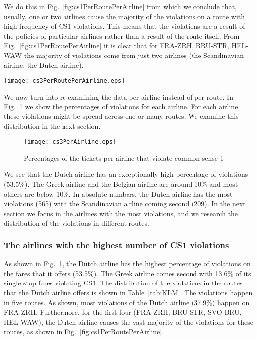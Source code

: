 We do this in Fig.~\ref{fig:cs1PerRoutePerAirline} from which we conclude that, usually, 
one or two airlines cause the majority of the violations on a route with high 
frequency of CS1 violations.  This means that the violations are a result of the
policies of particular airlines rather than a result of the route itself.  
From Fig.~\ref{fig:cs1PerRoutePerAirline} it is clear that for FRA-ZRH, BRU-STR,
HEL-WAW the majority of violations come from just two airlines (the Scandinavian airline, the Dutch airline).

\begin{figure*}[t]
\centering
\texttt{[image: cs3PerRoutePerAirline.eps]}
\caption{Percentages of the violations per airline and route}
\label{fig:cs1PerRoutePerAirline}
\end{figure*}

We now turn into re-examining the data per airline instead of per route. 
In Fig.~\ref{fig:cs1PerAirline} we show the percentages of violations
for each airline. For each airline these violations might be spread across
one or many routes. We examine this distribution in the next section.

\begin{figure}[H]
\centering
\texttt{[image: cs3PerAirline.eps]}
\caption{Percentages of the tickets per airline that violate common sense 1}
\label{fig:cs1PerAirline}
\end{figure}

We see that the Dutch airline has an exceptionally high percentage of violations (53.5\%). 
The Greek airline and the Belgian airline are around 10\% and most others are below 10\%.
In absolute numbers, the Dutch airline has the most violations (565) with the Scandinavian airline coming second (209).
In the next section we focus in the airlines with the most violations, and we
research the distribution of the violations in different routes.

\subsubsection{The airlines with the highest number of CS1 violations}
As shown in Fig.~\ref{fig:cs1PerAirline}, the Dutch airline has the highest percentage of 
violations on the fares that it offers (53.5\%). The Greek airline comes second with 13.6\% of its 
single stop fares violating CS1.
The distribution of the violations in the routes that the Dutch airline offers is shown in Table~\ref{tab:KLM}.
The violations happen in five routes. As shown, most violations of the Dutch airline (37.9\%) happen on FRA-ZRH.
Furthermore, for the first four (FRA-ZRH, BRU-STR, SVO-BRU, HEL-WAW), 
the Dutch airline causes the vast majority of the violations for these routes, 
as shown in Fig.~\ref{fig:cs1PerRoutePerAirline}.

